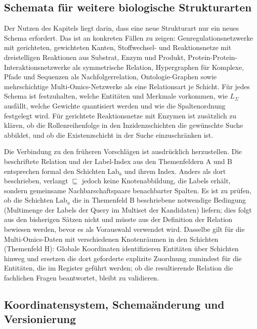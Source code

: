 \documentclass[a4paper,12pt, twoside]{report}
\theoremstyle{definition}
\begin{document}
\subsection{Schemata für weitere biologische Strukturarten}
\label{sec:ausb_univ_schemata}

Der Nutzen des Kapitels liegt darin, dass eine neue Strukturart nur ein neues Schema erfordert. Das ist an konkreten Fällen zu zeigen: Genregulationsnetzwerke mit gerichteten, gewichteten Kanten, Stoffwechsel- und Reaktionsnetze mit dreistelligen Reaktionen aus Substrat, Enzym und Produkt, Protein-Protein-Interaktionsnetzwerke als symmetrische Relation, Hypergraphen für Komplexe, Pfade und Sequenzen als Nachfolgerrelation, Ontologie-Graphen sowie mehrschichtige Multi-Omics-Netzwerke als eine Relationsart je Schicht. Für jedes Schema ist festzuhalten, welche Entitäten und Merkmale vorkommen, wie $L_\Sigma$ ausfällt, welche Gewichte quantisiert werden und wie die Spaltenordnung festgelegt wird. Für gerichtete Reaktionsnetze mit Enzymen ist zusätzlich zu klären, ob die Rollenreihenfolge in den Inzidenzschichten die gewünschte Suche abbildet, und ob die Existenzschicht in der Suche einzuschränken ist.

Die Verbindung zu den früheren Vorschlägen ist ausdrücklich herzustellen. Die beschriftete Relation und der Label-Index aus den Themenfeldern A und B entsprechen formal den Schichten $\mathrm{Lab}_a$ und ihrem Index. Anders als dort beschrieben, verlangt $\sqsubseteq$ jedoch keine Knotenabbildung, die Labels erhält, sondern gemeinsame Nachbarschaftspaare benachbarter Spalten. Es ist zu prüfen, ob die Schichten $\mathrm{Lab}_a$ die in Themenfeld B beschriebene notwendige Bedingung (Multimenge der Labels der Query im Multiset der Kandidaten) liefern; dies folgt aus den bisherigen Sätzen nicht und müsste aus der Definition der Relation bewiesen werden, bevor es als Vorauswahl verwendet wird. Dasselbe gilt für die Multi-Omics-Daten mit verschiedenen Knotenräumen in den Schichten (Themenfeld H): Globale Koordinaten identifizieren Entitäten über Schichten hinweg und ersetzen die dort geforderte explizite Zuordnung zumindest für die Entitäten, die im Register geführt werden; ob die resultierende Relation die fachlichen Fragen beantwortet, bleibt zu validieren.

\subsection{Koordinatensystem, Schemaänderung und Versionierung}
\label{sec:ausb_univ_koordinaten}
\end{document}
